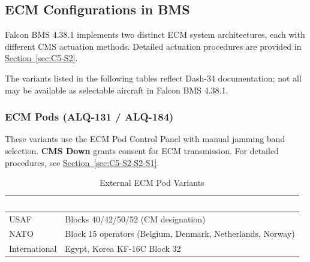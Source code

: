 \documentclass[11pt, a4paper, twoside]{report}
\newcommand{\secref}[1]{\hyperref[#1]{Section~\ref*{#1}}}
\begin{document}
\subsection{ECM Configurations in BMS}
\label{sec:C5-S3-S1}

Falcon BMS 4.38.1 implements two distinct ECM system architectures, each with different CMS actuation methods. Detailed actuation procedures are provided in \secref{sec:C5-S2}.

The variants listed in the following tables reflect Dash-34 documentation; not all may be available as selectable aircraft in Falcon BMS 4.38.1.

\subsubsection{ECM Pods (ALQ-131 / ALQ-184)}
\label{sec:C5-S3-S1-S1}

These variants use the ECM Pod Control Panel with manual jamming band selection. \textbf{CMS Down} grants consent for ECM transmission. For detailed procedures, see \secref{sec:C5-S2-S2-S1}.

\begin{table}[H]
\centering
\caption{External ECM Pod Variants}
\label{tab:C5-S3-external-ecm-pods}
\small
\renewcommand{\arraystretch}{1.25}
\begin{tabular}{|>{\raggedright\arraybackslash}p{3.0cm}|>{\raggedright\arraybackslash}p{5.8cm}|}
\hline
\rowcolor{headerblue}
\textcolor{white}{\textbf{Operator}} & \textcolor{white}{\textbf{Block/Variant}} \\
\hline
USAF & Blocks 40/42/50/52 (CM designation) \\
\hline
NATO & Block 15 operators (Belgium, Denmark, Netherlands, Norway) \\
\hline
International & Egypt, Korea KF-16C Block 32 \\
\hline
\end{tabular}
\end{table}

\end{document}
